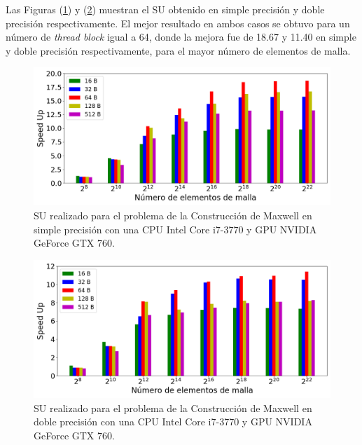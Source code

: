 Las Figuras (\ref{fig:s_760_MxC_simple_1.0}) y (\ref{fig:s_760_MxC_double_1.0}) muestran el SU obtenido en simple precisión y doble precisión respectivamente. El mejor resultado en ambos casos se obtuvo para un número de \textit{thread block} igual a 64, donde la mejora fue de 18.67 y 11.40 en simple y doble precisión respectivamente, para el mayor número de elementos de malla.


\begin{figure}[htbp]
	\centering
	\includegraphics[width=\textwidth]{figs_2/cap4/s_760_MxC_simple_10}
	\caption{SU realizado para el problema de la Construcción de Maxwell en simple precisión con una CPU Intel Core i7-3770 y GPU NVIDIA GeForce GTX 760.} 
	\label{fig:s_760_MxC_simple_1.0}	
\end{figure}

\begin{figure}[htbp]
	\centering
	\includegraphics[width=\textwidth]{figs_2/cap4/s_760_MxC_double_10}
	\caption{SU realizado para el problema de la Construcción de Maxwell en doble precisión con una CPU Intel Core i7-3770 y GPU NVIDIA GeForce GTX 760.} 
	\label{fig:s_760_MxC_double_1.0}	
\end{figure}

